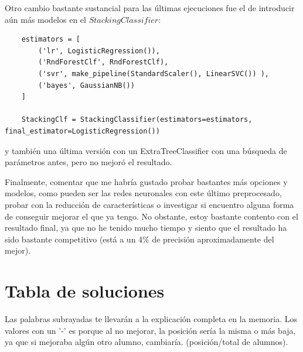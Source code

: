 \documentclass[11pt,a4paper]{article}
\begin{document}
Otro cambio bastante sustancial para las últimas ejecuciones fue el de introducir aún más modelos en el $StackingClassifier$:

\begin{lstlisting}
    estimators = [
        ('lr', LogisticRegression()),
        ('RndForestClf', RndForestClf),
        ('svr', make_pipeline(StandardScaler(), LinearSVC()) ),
        ('bayes', GaussianNB())
    ]

    StackingClf = StackingClassifier(estimators=estimators, final_estimator=LogisticRegression())
\end{lstlisting}

y también una última versión con un ExtraTreeClassifier con una búsqueda de parámetros antes, pero no mejoró el resultado.

Finalmente, comentar que me habría gustado probar bastantes más opciones y modelos, como pueden ser las redes neuronales con este
último preprocesado, probar con la reducción de características o investigar si encuentro alguna forma de conseguir mejorar el
que ya tengo. No obstante, estoy bastante contento con el resultado final, ya que no he tenido mucho tiempo y siento que el
resultado ha sido bastante competitivo (está a un 4\% de precisión aproximadamente del mejor).

\section{Tabla de soluciones}

Las palabras subrayadas te llevarán a la explicación completa en la memoria. Los valores con un '-' es porque al no mejorar, la
posición sería la misma o más baja, ya que si mejoraba algún otro alumno, cambiaría. (posición/total de alumnos).
\end{document}
